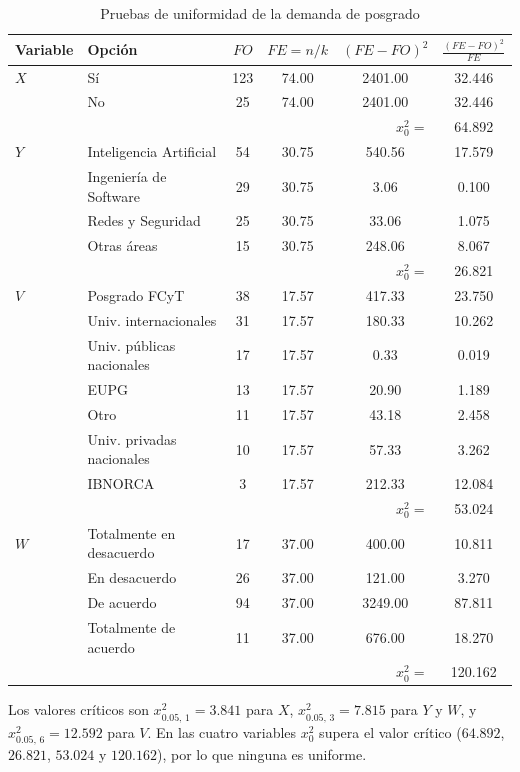 \documentclass[12pt, a4paper]{article}
\newenvironment{mitabla}[2][H]{%
  \begin{table}[#1]
  \centering
  \caption{#2}
  \small
}{%
  \end{table}
}
\begin{document}
\begin{mitabla}{Pruebas de uniformidad de la demanda de posgrado}\label{tab:a2-unif}
\begin{tabular}{llcccc}
\toprule
\textbf{Variable} & \textbf{Opción} & \textbf{$FO$} & \textbf{$FE = n/k$} & \textbf{$(FE-FO)^2$} & \textbf{$\frac{(FE-FO)^2}{FE}$} \\
\midrule
$X$ & Sí & 123 & 74.00 & 2401.00 & 32.446 \\
 & No & 25 & 74.00 & 2401.00 & 32.446 \\
 & \multicolumn{4}{r}{$x_0^2 =$} & 64.892 \\
\midrule
$Y$ & Inteligencia Artificial & 54 & 30.75 & 540.56 & 17.579 \\
 & Ingeniería de Software & 29 & 30.75 & 3.06 & 0.100 \\
 & Redes y Seguridad & 25 & 30.75 & 33.06 & 1.075 \\
 & Otras áreas & 15 & 30.75 & 248.06 & 8.067 \\
 & \multicolumn{4}{r}{$x_0^2 =$} & 26.821 \\
\midrule
$V$ & Posgrado FCyT & 38 & 17.57 & 417.33 & 23.750 \\
 & Univ. internacionales & 31 & 17.57 & 180.33 & 10.262 \\
 & Univ. públicas nacionales & 17 & 17.57 & 0.33 & 0.019 \\
 & EUPG & 13 & 17.57 & 20.90 & 1.189 \\
 & Otro & 11 & 17.57 & 43.18 & 2.458 \\
 & Univ. privadas nacionales & 10 & 17.57 & 57.33 & 3.262 \\
 & IBNORCA & 3 & 17.57 & 212.33 & 12.084 \\
 & \multicolumn{4}{r}{$x_0^2 =$} & 53.024 \\
\midrule
$W$ & Totalmente en desacuerdo & 17 & 37.00 & 400.00 & 10.811 \\
 & En desacuerdo & 26 & 37.00 & 121.00 & 3.270 \\
 & De acuerdo & 94 & 37.00 & 3249.00 & 87.811 \\
 & Totalmente de acuerdo & 11 & 37.00 & 676.00 & 18.270 \\
 & \multicolumn{4}{r}{$x_0^2 =$} & 120.162 \\
\bottomrule
\end{tabular}
\end{mitabla}

Los valores críticos son $x^2_{0.05,\,1} = 3.841$ para $X$, $x^2_{0.05,\,3}
= 7.815$ para $Y$ y $W$, y $x^2_{0.05,\,6} = 12.592$ para $V$. En las
cuatro variables $x_0^2$ supera el valor crítico ($64.892$, $26.821$,
$53.024$ y $120.162$), por lo que ninguna es uniforme.
\end{document}
